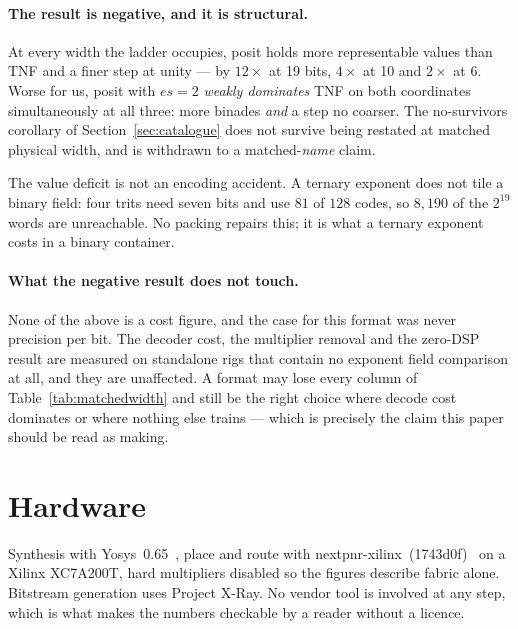 \documentclass[11pt]{article}
\theoremstyle{definition}
\begin{document}
\paragraph{The result is negative, and it is structural.} At every width the
ladder occupies, posit holds more representable values than TNF and a finer step
at unity --- by $12\times$ at 19 bits, $4\times$ at 10 and $2\times$ at 6. Worse
for us, posit with $es{=}2$ \emph{weakly dominates} TNF on both coordinates
simultaneously at all three: more binades \emph{and} a step no coarser. The
no-survivors corollary of Section~\ref{sec:catalogue} does not survive being
restated at matched physical width, and is withdrawn to a matched-\emph{name}
claim.

The value deficit is not an encoding accident. A ternary exponent does not tile
a binary field: four trits need seven bits and use $81$ of $128$ codes, so
$8{,}190$ of the $2^{19}$ words are unreachable. No packing repairs this; it is
what a ternary exponent costs in a binary container.

\paragraph{What the negative result does not touch.} None of the above is a
cost figure, and the case for this format was never precision per bit. The
decoder cost, the multiplier removal and the zero-DSP result are measured on
standalone rigs that contain no exponent field comparison at all, and they are
unaffected. A format may lose every column of
Table~\ref{tab:matchedwidth} and still be the right choice where decode cost
dominates or where nothing else trains --- which is precisely the claim this
paper should be read as making.

\section{Hardware}\label{sec:hardware}

Synthesis with Yosys~0.65~\cite{yosys}, place and route with
nextpnr-xilinx~(1743d0f)~\cite{nextpnr} on a
Xilinx XC7A200T, hard multipliers disabled so the figures describe fabric alone.
Bitstream generation uses Project X-Ray. No vendor tool is involved at any step,
which is what makes the numbers checkable by a reader without a licence.
\end{document}
